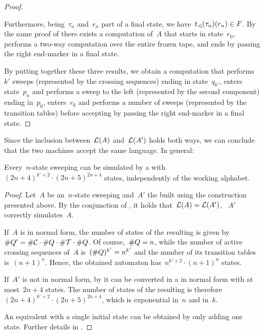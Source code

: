 \begin{proof}
\begin{enumerate}
		      Furthermore, being~$\tau_n$ and~$r_n$ part of a final state, we have~$t_\lhd(\tau_n)(r_n)\in F$.
		      By the same proof of  there exists a computation of~$A$ that starts in state~$r_0$, performs a two-way computation over the entire frozen tape, and ends by passing the right end-marker in a final state.
	\end{enumerate}
	By putting together these three results, we obtain a computation that performs~$k'$ sweeps (represented by the crossing sequences) ending in state~$q_{k'}$, enters state~$p_n$ and performs a sweep to the left (represented by the second component) ending in~$p_0$, enters~$r_0$ and performs a number of sweeps (represented by the transition tables) before accepting by passing the right end-marker in a final state.
\end{proof}

Since the inclusion between~$\mathcal L(A)$ and~$\mathcal L(A')$ holds both ways, we can conclude that the two machines accept the same language.
In general:
\begin{thrm}\label{thm:swkLAtoNFA}
	Every~$n$-state sweeping \kDLA can be simulated by a \ONFA with~$(2n+4)^{k'+2}\cdot(2n+5)^{2n+4}$ states, independently of the working alphabet.
\end{thrm}
\begin{proof}
	Let~$A$ be an~$n$-state sweeping \kDLA and~$A'$ the \ONFA built using the construction presented above.
	By the conjunction of , it holds that~$\mathcal L(A)=\mathcal L(A')$, \ie~$A'$ correctly simulates~$A$.

	If~$A$ is in normal form, the number of states of the resulting \ONFA is given by~$\# Q'=\# \mathcal C\cdot\# Q\cdot\# \mathcal T\cdot\# Q$.
	Of course,~$\# Q=n$, while the number of active crossing sequences of~$A$ is~$(\# Q)^{k'}=n^{k'}$ and the number of its transition tables is~$(n+1)^n$.
	Hence, the obtained automaton has~$n^{k'+2}\cdot(n+1)^n$ states.

	If~$A'$ is not in normal form, by  it can be converted in a \kDLA in normal form with at most~$2n+4$ states.
	The number of states of the resulting \ONFA is therefore~$(2n+4)^{k'+2}\cdot(2n+5)^{2n+4}$, which is exponential in~$n$ and in~$k$.

	An equivalent \ONFA with a single initial state can be obtained by only adding one state. Further details in .
\end{proof}

